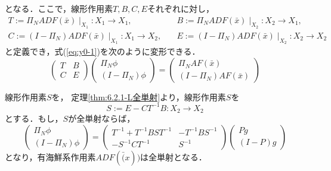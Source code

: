 \documentclass[11pt,a4paper,titlepage]{jsreport}
\theoremstyle{definition}
\begin{document}
となる．ここで，線形作用素$T,B,C,E$それぞれに対し，
\begin{equation*}
  \begin{split}
    T:= \Pi_N ADF(\bar{x}) \mid _{X_1}:X_1 \rightarrow X_1,\quad &
    B:= \Pi_N ADF(\bar{x}) \mid _{X_2}:X_2 \rightarrow X_1, \\
    C:= (I-\Pi_N) ADF(\bar{x}) \mid _{X_1}:X_1 \rightarrow X_2,\quad &
    E:= (I-\Pi_N) ADF(\bar{x}) \mid _{X_2}:X_2 \rightarrow X_2
  \end{split}
\end{equation*}
と定義でき，式(\ref{eq:y0-1})を次のように変形できる．
\begin{equation}
  \begin{pmatrix}
    T & B \\
    C & E
  \end{pmatrix}
  \begin{pmatrix}
    \Pi_N \phi \\
    (I -\Pi_N) \phi
  \end{pmatrix}
  =
  \begin{pmatrix}
    \Pi_N A F(\bar{x}) \\
    (I - \Pi_N) A F(\bar{x})
  \end{pmatrix}
\end{equation}

線形作用素$S$を，
定理\ref{thm:6.2.1-L全単射}より，線形作用素$S$を
\begin{equation*}
  S:=E-CT^{-1}B:X_2 \rightarrow X_2
\end{equation*}
とする．もし，$S$が全単射ならば，
\begin{equation*}
  \begin{pmatrix}
    \Pi_N \phi \\
    (I-\Pi_N)\phi 
  \end{pmatrix}
  =
  \begin{pmatrix}
    T^{-1}+T^{-1}BST^{-1} & -T^{-1}BS^{-1} \\
    -S^{-1}CT^{-1} & S^{-1}
  \end{pmatrix}
  \begin{pmatrix}
    Pg \\
    (I-P)g
  \end{pmatrix}
\end{equation*}
となり，有海鮮系作用素$ADF(\bar(x))$は全単射となる．



\hrulefill

\end{document}

